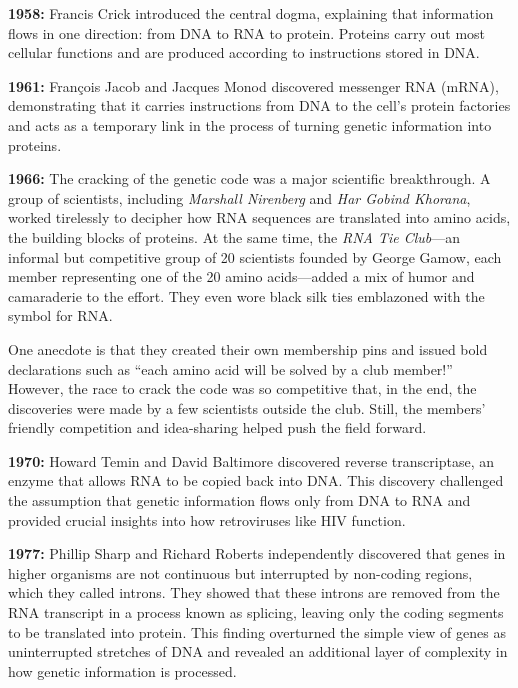 \medskip\noindent\textbf{1958:} Francis Crick introduced the central dogma, explaining that information flows in one direction: from DNA to RNA to protein. Proteins carry out most cellular functions and are produced according to instructions stored in DNA.

\medskip\noindent\textbf{1961:} François Jacob and Jacques Monod discovered messenger RNA (mRNA), demonstrating that it carries instructions from DNA to the cell’s protein factories and acts as a temporary link in the process of turning genetic information into proteins.

\medskip\noindent\textbf{1966:} The cracking of the genetic code was a major scientific breakthrough. A group of scientists, including \textit{Marshall Nirenberg} and \textit{Har Gobind Khorana}, worked tirelessly to decipher how RNA sequences are translated into amino acids, the building blocks of proteins. At the same time, the \textit{RNA Tie Club}—an informal but competitive group of 20 scientists founded by George Gamow, each member representing one of the 20 amino acids—added a mix of humor and camaraderie to the effort. They even wore black silk ties emblazoned with the symbol for RNA.

One anecdote is that they created their own membership pins and issued bold declarations such as ``each amino acid will be solved by a club member!'' However, the race to crack the code was so competitive that, in the end, the discoveries were made by a few scientists outside the club. Still, the members’ friendly competition and idea-sharing helped push the field forward.

\bigskip\noindent\textbf{1970:} Howard Temin and David Baltimore discovered reverse transcriptase, an enzyme that allows RNA to be copied back into DNA. This discovery challenged the assumption that genetic information flows only from DNA to RNA and provided crucial insights into how retroviruses like HIV function.

\medskip\noindent\textbf{1977:} Phillip Sharp and Richard Roberts independently discovered that genes in higher organisms are not continuous but interrupted by non-coding regions, which they called introns. They showed that these introns are removed from the RNA transcript in a process known as splicing, leaving only the coding segments to be translated into protein. This finding overturned the simple view of genes as uninterrupted stretches of DNA and revealed an additional layer of complexity in how genetic information is processed.

